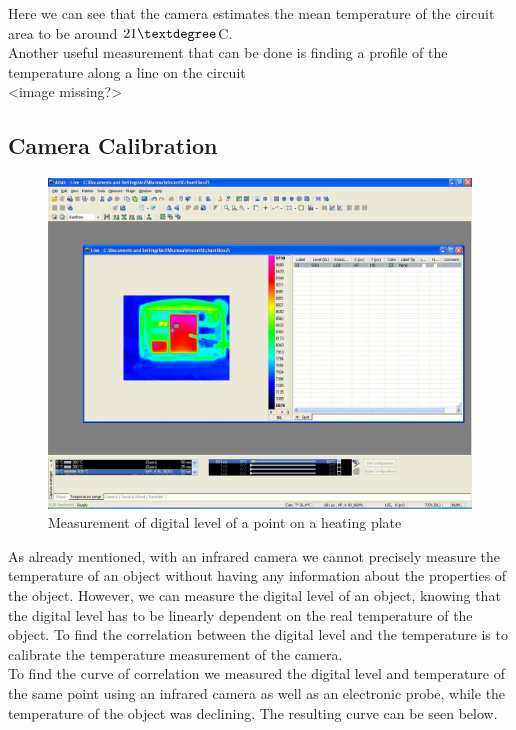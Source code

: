 \documentclass[english]{article}
\begin{document}
Here we can see that the camera estimates the mean temperature of the circuit area to be around $21 \textdegree$C.\\
Another useful measurement that can be done is finding a profile of the temperature along a line on the circuit\\
<image missing?>

\subsection{Camera Calibration}
\begin{figure}[H]
	\centering
	\includegraphics[width=1\linewidth]{Pictures/calib.JPG}
	\caption{Measurement of digital level of a point on a heating plate}
	\label{fig:four}
\end{figure}
As already mentioned, with an infrared camera we cannot precisely measure the temperature of an object without having any information about the properties of the object.
However, we can measure the digital level of an object, knowing that the digital level has to be linearly dependent on the real temperature of the object.
To find the correlation between the digital level and the temperature is to calibrate the temperature measurement of the camera.\\
To find the curve of correlation we measured the digital level and temperature of the same point using an infrared camera as well as an electronic probe, while the temperature of the object was declining.
The resulting curve can be seen below.\\
\end{document}
